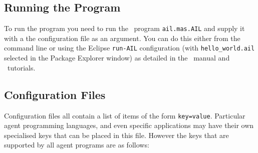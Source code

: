 \subsection{Running the Program}

To run the program you need to run the \java\ program \texttt{ail.mas.AIL} and supply it with a the configuration file as an argument.  You can do this either from the command line or using the Eclipse \texttt{run-AIL} configuration (with \texttt{hello\_world.ail} selected in the Package Explorer window) as detailed in the \mcapl\ manual and \ail\ tutorials.

\subsection{Configuration Files}
\label{sec:configuration}

Configuration files all contain a list of items of the form \texttt{key=value}.  Particular agent programming languages, and even specific applications may have their own specialised keys that can be placed in this file.  However the keys that are supported by all agent programs are as follows:

